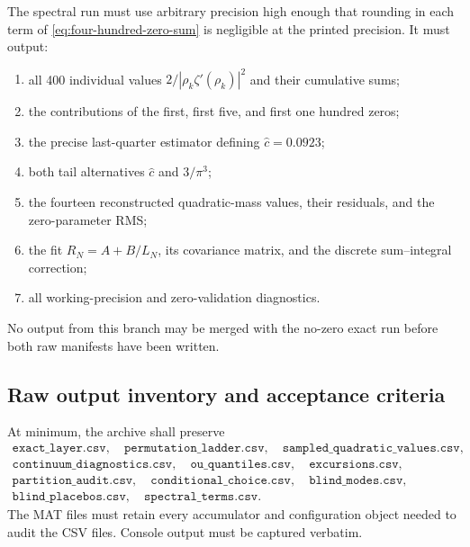 \documentclass[11pt,reqno]{amsart}
\numberwithin{equation}{section}
\theoremstyle{plain}
\theoremstyle{definition}
\theoremstyle{remark}
\begin{document}
The spectral run must use arbitrary precision high enough that rounding in
each term of \eqref{eq:four-hundred-zero-sum} is negligible at the printed
precision.  It must output:
\begin{enumerate}[label=(\alph*)]
\item all 400 individual values
\(2/|\rho_k\zeta'(\rho_k)|^2\) and their cumulative sums;
\item the contributions of the first, first five, and first one hundred
zeros;
\item the precise last-quarter estimator defining \(\widehat c=0.0923\);
\item both tail alternatives \(\widehat c\) and \(3/\pi^3\);
\item the fourteen reconstructed quadratic-mass values, their residuals, and
the zero-parameter RMS;
\item the fit \(R_N=A+B/L_N\), its covariance matrix, and the discrete
sum--integral correction;
\item all working-precision and zero-validation diagnostics.
\end{enumerate}
No output from this branch may be merged with the no-zero exact run before
both raw manifests have been written.

\subsection{Raw output inventory and acceptance criteria}
\label{subsec:raw-output-inventory}

At minimum, the archive shall preserve
\begin{equation}
\begin{gathered}
\texttt{exact\_layer.csv},\quad
\texttt{permutation\_ladder.csv},\quad
\texttt{sampled\_quadratic\_values.csv},\\
\texttt{continuum\_diagnostics.csv},\quad
\texttt{ou\_quantiles.csv},\quad
\texttt{excursions.csv},\\
\texttt{partition\_audit.csv},\quad
\texttt{conditional\_choice.csv},\quad
\texttt{blind\_modes.csv},\\
\texttt{blind\_placebos.csv},\quad
\texttt{spectral\_terms.csv}.
\end{gathered}
\label{eq:required-output-files}
\end{equation}
The MAT files must retain every accumulator and configuration object needed
to audit the CSV files.  Console output must be captured verbatim.
\end{document}
